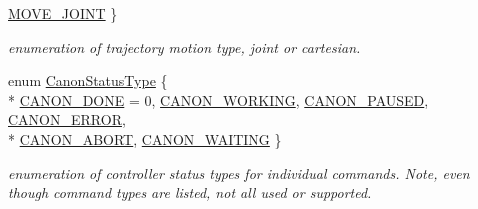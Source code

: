 \begin{DoxyCompactItemize}
\hyperlink{namespaceRCS_ab06a825aaa263c253e8100d626609ec4a275cc65ce33e5cfc57c57abb4a208223}{M\-O\-V\-E\-\_\-\-J\-O\-I\-N\-T}
 \}
\begin{DoxyCompactList}\small\item\em enumeration of trajectory motion type, joint or cartesian. \end{DoxyCompactList}\item 
enum \hyperlink{namespaceRCS_a0e720341c250145b8a2bbf6a1afa777d}{Canon\-Status\-Type} \{ \\*
\hyperlink{namespaceRCS_a0e720341c250145b8a2bbf6a1afa777daabf0ebc3e57ea212970f33430d917eae}{C\-A\-N\-O\-N\-\_\-\-D\-O\-N\-E} = 0, 
\hyperlink{namespaceRCS_a0e720341c250145b8a2bbf6a1afa777da4a0ac89d145f0ac2ab9d2322ea4f3a08}{C\-A\-N\-O\-N\-\_\-\-W\-O\-R\-K\-I\-N\-G}, 
\hyperlink{namespaceRCS_a0e720341c250145b8a2bbf6a1afa777da86acce9ac34e5ca0b0056b11810af584}{C\-A\-N\-O\-N\-\_\-\-P\-A\-U\-S\-E\-D}, 
\hyperlink{namespaceRCS_a0e720341c250145b8a2bbf6a1afa777dac78240d093ffb8a630852bac1aa33905}{C\-A\-N\-O\-N\-\_\-\-E\-R\-R\-O\-R}, 
\\*
\hyperlink{namespaceRCS_a0e720341c250145b8a2bbf6a1afa777da094244917abcd576f2118e80803279ee}{C\-A\-N\-O\-N\-\_\-\-A\-B\-O\-R\-T}, 
\hyperlink{namespaceRCS_a0e720341c250145b8a2bbf6a1afa777da101acfc97dc944ffd40c3e8e0cf7c179}{C\-A\-N\-O\-N\-\_\-\-W\-A\-I\-T\-I\-N\-G}
 \}
\begin{DoxyCompactList}\small\item\em enumeration of controller status types for individual commands. Note, even though command types are listed, not all used or supported. \end{DoxyCompactList}\end{DoxyCompactItemize}

